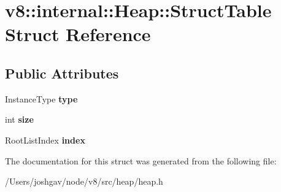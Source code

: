 \hypertarget{structv8_1_1internal_1_1_heap_1_1_struct_table}{}\section{v8\+:\+:internal\+:\+:Heap\+:\+:Struct\+Table Struct Reference}
\label{structv8_1_1internal_1_1_heap_1_1_struct_table}
\subsection*{Public Attributes}
\begin{DoxyCompactItemize}
\item 
Instance\+Type {\bfseries type}\hypertarget{structv8_1_1internal_1_1_heap_1_1_struct_table_a4fd2bad2d771264a2e319f3d2cbdca7d}{}\label{structv8_1_1internal_1_1_heap_1_1_struct_table_a4fd2bad2d771264a2e319f3d2cbdca7d}

\item 
int {\bfseries size}\hypertarget{structv8_1_1internal_1_1_heap_1_1_struct_table_ad43606776e8d7892da7ebafb28f8d2dc}{}\label{structv8_1_1internal_1_1_heap_1_1_struct_table_ad43606776e8d7892da7ebafb28f8d2dc}

\item 
Root\+List\+Index {\bfseries index}\hypertarget{structv8_1_1internal_1_1_heap_1_1_struct_table_a608f8e7e78ab1da2a2632aa6bf95fa3f}{}\label{structv8_1_1internal_1_1_heap_1_1_struct_table_a608f8e7e78ab1da2a2632aa6bf95fa3f}

\end{DoxyCompactItemize}


The documentation for this struct was generated from the following file\+:\begin{DoxyCompactItemize}
\item 
/\+Users/joshgav/node/v8/src/heap/heap.\+h\end{DoxyCompactItemize}
